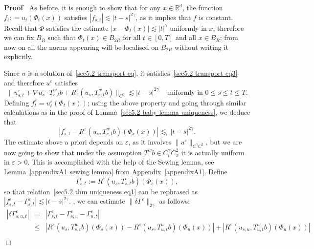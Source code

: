 \documentclass[10pt]{article}
\newcommand{\assign}{:=}
\newenvironment{proof}{\noindent\textbf{Proof\ }}{\hspace*{\fill}$\Box$\medskip}
\begin{document}
\begin{proof}
  As before, it is enough to show that for any $x \in \mathbb{R}^d$, the
  function $f_t : = u_t (\Phi_t (x))$ satisfies $| f_{s, t} | \lesssim | t - s
  |^{2 \gamma}$, as it implies that $f$ is constant. Recall that $\Phi$
  satisfies the estimate $| x - \Phi_t (x) | \lesssim | t |^{\gamma}$
  uniformly in $x$, therefore we can fix $B_R$ such that $\Phi_t (x) \in B_{2
  R}$ for all $t \in [0, T]$ and all $x \in B_R$; from now on all the norms
  appearing will be localised on $B_{2 R}$ without writing it explicitly.
  
  Since $u$ is a solution of~{\eqref{sec5.2 transport eq}}, it
  satisfies~{\eqref{sec5.2 transport eq3}} and therefore $u^{\varepsilon}$
  satisfies
  \[ \| u^{\varepsilon}_{s, t} + \nabla u^{\varepsilon}_s \cdot T^w_{s, t} b +
     R^{\varepsilon} (u_s, T^w_{s, t} b) \|_{C^0} \lesssim | t - s |^{2
     \gamma} \quad \text{uniformly in } 0 \leqslant s \leqslant t \leqslant T.
  \]
  Defining $f^{\varepsilon}_t = u^{\varepsilon}_t (\Phi_t (x))$; using the
  above property and going through similar calculations as in the proof of
  Lemma~\ref{sec5.2 baby lemma uniqueness}, we deduce that
  \[ | f^{\varepsilon}_{s, t} - R^{\varepsilon} (u_s, T^w_{s, t} b) (\Phi_s
     (x)) | \lesssim_{\varepsilon} | t - s |^{2 \gamma} . \label{sec5.2 thm
     uniqueness eq1} \]
  The estimate above a priori depends on $\varepsilon$, as it involves $\|
  u^{\varepsilon} \|_{C^{\gamma} C^2}$, but we are now going to show that
  under the assumption $T^w b \in C^{\gamma}_t C^2_x$ it is actually uniform
  in $\varepsilon > 0$. This is accomplished with the help of the Sewing
  lemma, see Lemma~\ref{appendixA1 sewing lemma} from
  Appendix~\ref{appendixA1}. Define
  \[ \Gamma^{\varepsilon}_{s, t} \assign R^{\varepsilon} (u_s, T^w_{s, t} b)
     (\Phi_s (x)), \]
  so that relation~{\eqref{sec5.2 thm uniqueness eq1}} can be rephrased as $|
  f^{\varepsilon}_{s, t} - \Gamma^{\varepsilon}_{s, t} | \lesssim | t - s |^{2
  \gamma}$. , we can estimate $\| \delta \Gamma^{\varepsilon} \|_{2 \gamma}$
  as follows:
  \begin{eqnarray*}
    | \delta \Gamma^{\varepsilon}_{s, u, t} | & = & | \Gamma^{\varepsilon}_{s,
    t} - \Gamma^{\varepsilon}_{s, u} - \Gamma^{\varepsilon}_{u, t} |\\
    & \leqslant & | R^{\varepsilon} (u_s, T^w_{s, t} b) (\Phi_s (x)) -
    R^{\varepsilon} (u_s, T^w_{u, t} b) (\Phi_u (x)) | + | R^{\varepsilon}
    (u_{s, u}, T^w_{u, t} b) (\Phi_u (x)) |\\

\end{eqnarray*}
\end{proof}
\end{document}
